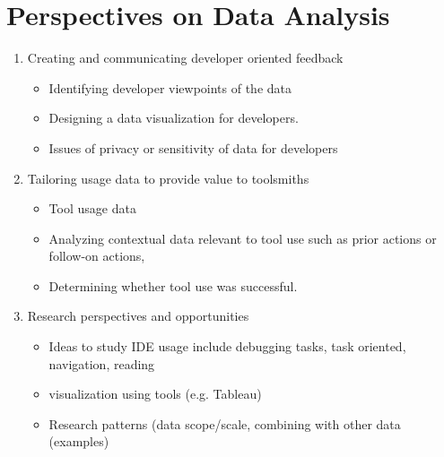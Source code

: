 \section{ Perspectives on Data Analysis}


\begin{enumerate}
\item Creating and communicating developer oriented feedback
\begin{itemize}
	\item
	Identifying developer viewpoints of the data
	\item
	Designing a data visualization for developers. 
	\item
	Issues of privacy or sensitivity of data for developers
\end{itemize}
\item Tailoring usage data to provide value to toolsmiths
\begin{itemize}
	\item 
	Tool usage data
	\item 
	Analyzing contextual data relevant to tool use such as prior actions or follow-on actions, 
	\item 
	Determining whether tool use was successful.
\end{itemize}
\item Research perspectives and opportunities
\begin{itemize}
	\item
	Ideas to study IDE usage include debugging tasks, task oriented, navigation, reading
	\item visualization using tools (e.g. Tableau)
	\item Research patterns (data scope/scale, combining with other data (examples)
\end{itemize}

\end{enumerate}
